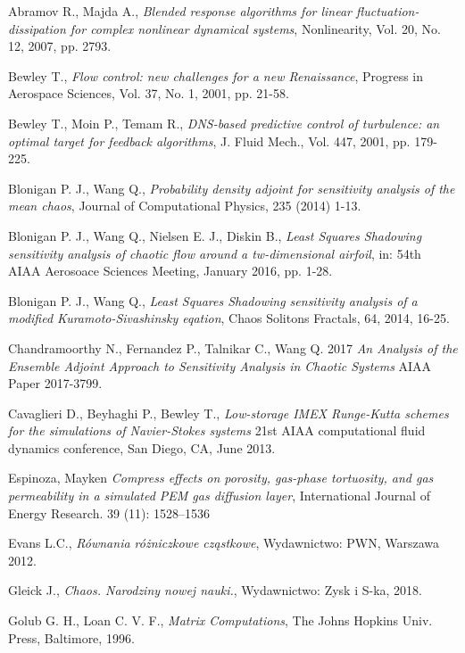 \documentclass[12pt]{article}
\begin{document}
\begin{thebibliography}{99}

 Abramov R., Majda A.,
\emph{Blended response algorithms for linear fluctuation-dissipation for complex nonlinear dynamical systems},
Nonlinearity, Vol. 20, No. 12, 2007, pp. 2793.
	
 Bewley T.,
\emph{Flow control: new challenges for a new Renaissance},
Progress in Aerospace Sciences, Vol. 37, No. 1, 2001, pp. 21-58.

 Bewley T., Moin P., Temam R.,
\emph{DNS-based predictive control of turbulence: an optimal target for feedback algorithms},
J. Fluid Mech., Vol. 447, 2001, pp. 179-225.
	
 Blonigan P. J., Wang Q.,
\emph{Probability density adjoint for sensitivity analysis of the mean chaos},
Journal of Computational Physics, 235 (2014) 1-13.

 Blonigan P. J., Wang Q., Nielsen E. J., Diskin B.,
\emph{Least Squares Shadowing sensitivity analysis of chaotic flow around a tw-dimensional airfoil},
in: 54th AIAA Aerosoace Sciences Meeting, January 2016, pp. 1-28.

 Blonigan P. J., Wang Q.,
\emph{Least Squares Shadowing sensitivity analysis of a modified Kuramoto-Sivashinsky eqation},
Chaos Solitons Fractals, 64, 2014, 16-25.

 Chandramoorthy N., Fernandez P., Talnikar C., Wang Q. 2017 
\emph{An Analysis of the Ensemble Adjoint Approach to Sensitivity Analysis in Chaotic Systems} 
AIAA Paper 2017-3799. 

 Cavaglieri D., Beyhaghi P., Bewley T.,  
\emph{Low-storage IMEX Runge-Kutta schemes for the simulations of Navier-Stokes systems} 
21st AIAA computational fluid dynamics conference, San Diego, CA, June 2013.

 Espinoza, Mayken 
\emph{Compress effects on porosity, gas-phase tortuosity, and gas permeability in a simulated PEM gas diffusion layer},
International Journal of Energy Research. 39 (11): 1528–1536

 Evans L.C.,
\emph{Równania różniczkowe cząstkowe},
Wydawnictwo: PWN, Warszawa 2012.

 Gleick J.,
\emph{Chaos. Narodziny nowej nauki.},
Wydawnictwo: Zysk i S-ka, 2018.

 Golub G. H., Loan C. V. F.,
\emph{Matrix Computations},
The Johns Hopkins Univ. Press, Baltimore, 1996.


\end{thebibliography}
\end{document}

